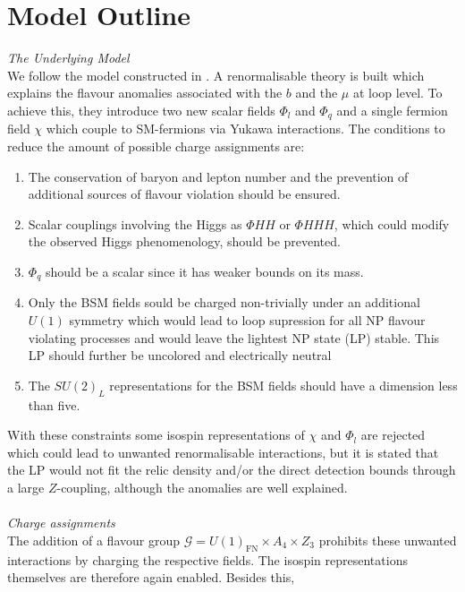 \section{Model Outline}
\textit{The Underlying Model}\\
\noindent We follow the model constructed
in \cite{Grip}. A renormalisable theory is built which explains the flavour anomalies associated with the $b$ and the $\mu$ at loop level. To achieve this, 
they introduce two new scalar fields $\Phi_l$ and $\Phi_q$ and a single fermion field $\chi$ which couple to SM-fermions via Yukawa interactions. 
The conditions to reduce the amount of possible charge assignments are:
\begin{enumerate}
 \item The conservation of baryon and lepton number and the prevention of additional sources of flavour violation should be ensured.
 \item Scalar couplings involving the Higgs as $\Phi H H$ or $\Phi H H H$, which could modify the observed Higgs phenomenology, should be prevented.
 \item $\Phi_q$ should be a scalar since it has weaker bounds on its mass.
 \item Only the BSM fields sould be charged non-trivially under an additional $U(1)$ symmetry which would lead to loop supression for all NP 
 flavour violating processes and would leave the lightest NP state (LP) stable. This LP should further be uncolored and electrically neutral 
 \item The $SU(2)_L$ representations for the BSM fields should have a dimension less than five.
\end{enumerate}
With these constraints some isospin representations of $\chi$ and $\Phi_l$ are rejected which could lead to unwanted renormalisable interactions, 
but it is stated that the LP would not fit the relic density and/or the direct detection bounds through a large $Z$-coupling, although the anomalies 
are well explained. \\ \\
\noindent \textit{Charge assignments}\\ \noindent
The addition of a flavour group $\mathcal{G} = U(1)_\text{FN}\times A_4 \times Z_3$ \cite{FerA4}\cite{VarzTotMod} prohibits
these unwanted interactions by charging the respective fields. The isospin representations themselves are therefore again enabled. Besides this,
